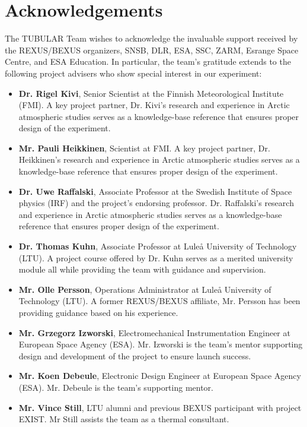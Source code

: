 \section*{Acknowledgements} \markboth{}{}

The TUBULAR Team wishes to acknowledge the invaluable support received by the REXUS/BEXUS organizers, SNSB, DLR, ESA, SSC, ZARM, Esrange Space Centre, and ESA Education. In particular, the team's gratitude extends to the following project advisers who show special interest in our experiment:

\begin{itemize}
  \item \textbf{Dr. Rigel Kivi}, Senior Scientist at the Finnish Meteorological Institute (FMI). A key project partner, Dr. Kivi's research and experience in Arctic atmospheric studies serves as a knowledge-base reference that ensures proper design of the experiment.
  \item \textbf{Mr. Pauli Heikkinen}, Scientist at FMI. A key project partner, Dr. Heikkinen's research and experience in Arctic atmospheric studies serves as a knowledge-base reference that ensures proper design of the experiment.
  \item \textbf{Dr. Uwe Raffalski}, Associate Professor at the Swedish Institute of Space physics (IRF) and the project's endorsing professor. Dr. Raffalski's research and experience in Arctic atmospheric studies serves as a knowledge-base reference that ensures proper design of the experiment.
  \item \textbf{Dr. Thomas Kuhn}, Associate Professor at Luleå  University of Technology (LTU). A project course offered by Dr. Kuhn serves as a merited university module all while providing the team with guidance and supervision.
  \item \textbf{Mr. Olle Persson}, Operations Administrator at Luleå University of Technology (LTU). A former REXUS/BEXUS affiliate, Mr. Persson has been providing guidance based on his experience.
  \item \textbf{Mr. Grzegorz Izworski}, Electromechanical Instrumentation Engineer at European Space Agency (ESA). Mr. Izworski is the team's mentor supporting design and development of the project to ensure launch success.
  \item \textbf{Mr. Koen Debeule}, Electronic Design Engineer at European Space Agency (ESA). Mr. Debeule is the team's supporting mentor.
  \item \textbf{Mr. Vince Still}, LTU alumni and previous BEXUS participant with project EXIST. Mr Still assists the team as a thermal consultant.
\end{itemize}

